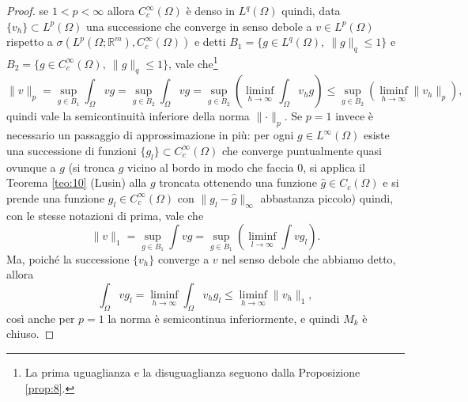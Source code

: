 \documentclass[a4paper,11pt]{book}
\theoremstyle{plain}
\theoremstyle{definition}
\theoremstyle{remark}
\newcommand{\R}{\mathbb{R}}
\newcommand{\norm}[1]{\lVert#1\rVert}
\begin{document}
\begin{proof}
    \begin{comment}
    siano $p{\in}[1,+\infty)$ e $v\in L^{p}(\Omega)$, detto $q=p/(p-1)$ (intendendo che $q=\infty$ se $p=1$), vale che
    \[
		\left(\int_{\Omega}|v|^{p}\right)^{1/p} = \sup_{g}\int_{\Omega}vg\qquad\text{con }g\in L^{q}, \norm{g}_{q}\leq 1.
    \]
    \end{comment}
    se $1<p<\infty$ allora $C^{\infty}_{c}(\Omega)$ è denso in $L^{q}(\Omega)$ quindi, data $\{v_{h}\}\subset L^{p}(\Omega)$ una successione che converge in senso debole a $v\in L^{p}(\Omega)$ rispetto a $\sigma(L^{p}(\Omega;\R^{m}),C^{\infty}_{c}(\Omega))$ e detti $B_{1} = \{g\in L^{q}(\Omega),\ \norm{g}_{q}\leq 1\}$ e $B_{2} = \{g\in C^{\infty}_{c}(\Omega),\ \norm{g}_{q}\leq 1\}$, vale che\footnote{La prima uguaglianza e la disuguaglianza seguono dalla Proposizione \ref{prop:8}.}
    \[
		\norm{v}_{p} = \sup_{g\in B_{1}}\int_{\Omega}vg = \sup_{g\in B_{2}}\int_{\Omega} vg = \sup_{g\in B_{2}}\left(\liminf_{h\to\infty}\int_{\Omega}v_{h}g\right) \leq \sup_{g\in B_{2}}\left(\liminf_{h\to\infty}\norm{v_{h}}_{p}\right),
    \]
    quindi vale la semicontinuità inferiore della norma $\norm{\cdot}_{p}$. Se $p=1$ invece è necessario un passaggio di approssimazione in più: per ogni $g\in L^{\infty}(\Omega)$ esiste una successione di funzioni $\{g_{l}\}\subset C^{\infty}_{c}(\Omega)$ che converge puntualmente quasi ovunque a $g$ (si tronca $g$ vicino al bordo in modo che faccia $0$, si applica il Teorema \ref{teo:10} (Lusin) alla $g$ troncata ottenendo una funzione $\hat{g}\in C_{c}(\Omega)$ e si prende una funzione $g_{l}\in C^{\infty}_{c}(\Omega)$ con $\norm{g_{l}-\hat{g}}_{\infty}$ abbastanza piccolo) quindi, con le stesse notazioni di prima, vale che
    \[
		\norm{v}_{1} = \sup_{g\in B_{1}}\int vg = \sup_{g\in B_{1}}\left( \liminf_{l\to\infty}\int vg_{l} \right).
    \]
    Ma, poiché la successione $\{v_{h}\}$ converge a $v$ nel senso debole che abbiamo detto, allora
    \[
		\int_{\Omega}vg_{l} = \liminf_{h\to\infty}\int_{\Omega}v_{h}g_{l}\leq \liminf_{h\to\infty}\norm{v_{h}}_{1},
    \]
    così anche per $p=1$ la norma è semicontinua inferiormente, e quindi $M_{k}$ è chiuso.
    \begin{comment}
    Se $1<p<\infty$ allora potevamo prendere $g\in C^{\infty}_{c}(\Omega)$ con $\norm{g}_{q}\leq 1$ grazie alla densità di $C^{\infty}_{c}(\Omega)$ in $L^{p}(\Omega)$, se invece $p=1$ è necessario troncare le $g\in L^{\infty}(\Omega)$: per una fissata $g\in L^{\infty}(\Omega)$ basta usare il Teorema \ref{teo:10} (Lusin) per ottenere una successione di funzioni $v_{k}\in C(\Omega)$ tali che

\end{comment}
\end{proof}
\end{document}
